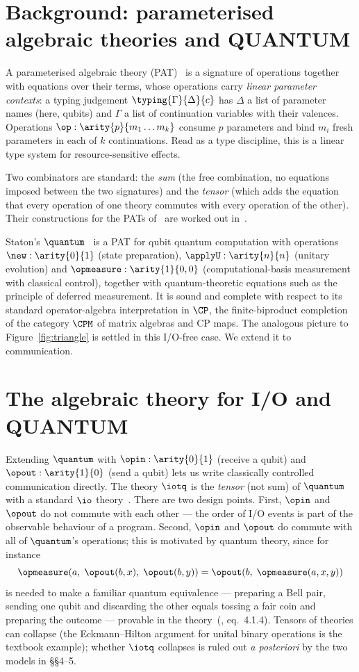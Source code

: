 \section{Background: parameterised algebraic theories and QUANTUM}

A parameterised algebraic theory (PAT)~\cite{statonpopl15} is a signature of operations together with equations over their terms, whose operations carry \emph{linear parameter contexts}: a typing judgement $\typing{\Gamma}{\Delta}{c}$ has $\Delta$ a list of parameter names (here, qubits) and $\Gamma$ a list of continuation variables with their valences. Operations $\op:\arity{p}{m_1\dots m_k}$ consume $p$ parameters and bind $m_i$ fresh parameters in each of $k$ continuations. Read as a type discipline, this is a linear type system for resource-sensitive effects.

Two combinators are standard: the \emph{sum} (the free combination, no equations imposed between the two signatures) and the \emph{tensor} (which adds the equation that every operation of one theory commutes with every operation of the other). Their constructions for the PATs of~\cite{statonpopl15} are worked out in~\cite{wang_algebraic_2024}.

Staton's $\quantum$~\cite{statonpopl15} is a PAT for qubit quantum computation with operations $\new:\arity{0}{1}$ (state preparation), $\applyU:\arity{n}{n}$ (unitary evolution) and $\opmeasure:\arity{1}{0,0}$ (computational-basis measurement with classical control), together with quantum-theoretic equations such as the principle of deferred measurement. It is sound and complete with respect to its standard operator-algebra interpretation in $\CP$, the finite-biproduct completion of the category $\CPM$ of matrix algebras and CP maps. The analogous picture to Figure~\ref{fig:triangle} is settled in this I/O-free case. We extend it to communication.

\section{The algebraic theory for I/O and QUANTUM}

Extending $\quantum$ with $\opin:\arity{0}{1}$ (receive a qubit) and $\opout:\arity{1}{0}$ (send a qubit) lets us write classically controlled communication directly. The theory $\iotq$ is the \emph{tensor} (not sum) of $\quantum$ with a standard $\io$ theory~\cite{sums_tensors_HYLAND200670}. There are two design points. First, $\opin$ and $\opout$ do not commute with each other --- the order of I/O events is part of the observable behaviour of a program. Second, $\opin$ and $\opout$ do commute with all of $\quantum$'s operations; this is motivated by quantum theory, since for instance
$$\opmeasure(a,\; \opout(b, x),\; \opout(b, y)) = \opout(b,\; \opmeasure(a, x, y))$$
is needed to make a familiar quantum equivalence --- preparing a Bell pair, sending one qubit and discarding the other equals tossing a fair coin and preparing the outcome --- provable in the theory~(\cite{wang_algebraic_2024}, eq.~4.1.4). Tensors of theories can collapse (the Eckmann--Hilton argument for unital binary operations is the textbook example); whether $\iotq$ collapses is ruled out \emph{a posteriori} by the two models in \S\S4--5.

